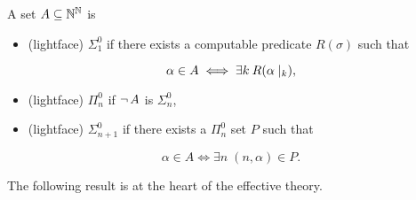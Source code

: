 \begin{definition}\label{def-effective-borel}A set $A \subseteq \mathbb{N}^{\mathbb{N}}$ is

\begin{itemize}
\item (lightface) $\Sigma^0_1$ if there exists a computable predicate $R(\sigma)$ such that
\end{itemize}
\begin{equation*}
\alpha \in A \iff \exists k \: R(\alpha\mid_{k}),
\end{equation*}
\begin{itemize}
\item (lightface) $\Pi^0_n$ if $\neg \, A$ is $\Sigma^0_n$,
\item (lightface) $\Sigma^0_{n+1}$ if there exists a $\Pi^0_n$ set $P$ such that
\end{itemize}
\begin{equation*}
\alpha \in A \iff \exists n \; (n,\alpha) \in P.
\end{equation*}
\end{definition}The following result is at the heart of the effective theory.

